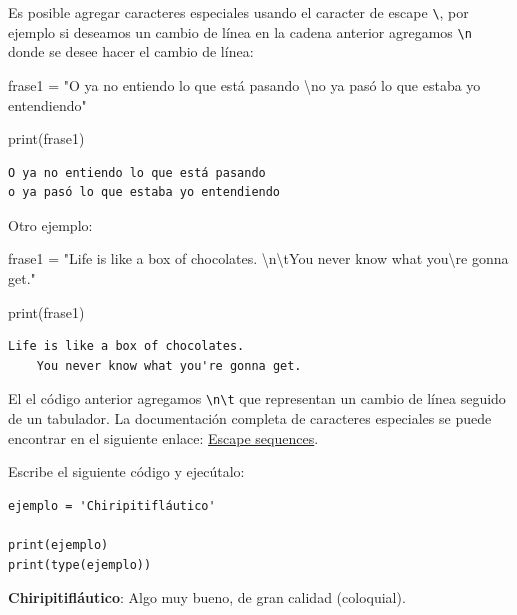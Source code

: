 \documentclass[
  spanish,
  letterpaper,
]{scrbook}
\newenvironment{Shaded}{\begin{snugshade}}{\end{snugshade}}
\newcommand{\BuiltInTok}[1]{\textcolor[rgb]{0.00,0.23,0.31}{#1}}
\newcommand{\CharTok}[1]{\textcolor[rgb]{0.13,0.47,0.30}{#1}}
\newcommand{\NormalTok}[1]{\textcolor[rgb]{0.00,0.23,0.31}{#1}}
\newcommand{\OperatorTok}[1]{\textcolor[rgb]{0.37,0.37,0.37}{#1}}
\newcommand{\StringTok}[1]{\textcolor[rgb]{0.13,0.47,0.30}{#1}}
\theoremstyle{definition}
\theoremstyle{remark}
\newcounter{quartocalloutexmno}
\newcommand{\quartocalloutexm}[1]{\refstepcounter{quartocalloutexmno}\label{#1}}
\begin{document}
Es posible agregar caracteres especiales usando el caracter de escape
\texttt{\textbackslash{}}, por ejemplo si deseamos un cambio de línea en
la cadena anterior agregamos \texttt{\textbackslash{}n} donde se desee
hacer el cambio de línea:

\begin{Shaded}
\begin{Highlighting}[]
\NormalTok{frase1 }\OperatorTok{=} \StringTok{"O ya no entiendo lo que está pasando }\CharTok{\textbackslash{}n}\StringTok{o ya pasó lo que estaba yo entendiendo"}

\BuiltInTok{print}\NormalTok{(frase1)}
\end{Highlighting}
\end{Shaded}

\begin{verbatim}
O ya no entiendo lo que está pasando 
o ya pasó lo que estaba yo entendiendo
\end{verbatim}

Otro ejemplo:

\begin{Shaded}
\begin{Highlighting}[]
\NormalTok{frase1 }\OperatorTok{=} \StringTok{"Life is like a box of chocolates. }\CharTok{\textbackslash{}n\textbackslash{}t}\StringTok{You never know what you}\CharTok{\textbackslash{}\textquotesingle{}}\StringTok{re gonna get."}

\BuiltInTok{print}\NormalTok{(frase1)}
\end{Highlighting}
\end{Shaded}

\begin{verbatim}
Life is like a box of chocolates. 
    You never know what you're gonna get.
\end{verbatim}

El el código anterior agregamos
\texttt{\textbackslash{}n\textbackslash{}t} que representan un cambio de
línea seguido de un tabulador. La documentación completa de caracteres
especiales se puede encontrar en el siguiente enlace:
\href{https://docs.python.org/es/3/reference/lexical_analysis.html\#escape-sequences}{Escape
sequences}.

\begin{tcolorbox}[enhanced jigsaw, colframe=quarto-callout-tip-color-frame, opacityback=0, toprule=.15mm, colback=white, coltitle=black, leftrule=.75mm, arc=.35mm, breakable, left=2mm, bottomtitle=1mm, rightrule=.15mm, bottomrule=.15mm, colbacktitle=quarto-callout-tip-color!10!white, toptitle=1mm, titlerule=0mm, opacitybacktitle=0.6, title={Tip \ref*{exm-l2-1}: Definición de una cadena.}]

\quartocalloutexm{exm-l2-1} 

Escribe el siguiente código y ejecútalo:

\begin{verbatim}
ejemplo = 'Chiripitifláutico'

print(ejemplo)
print(type(ejemplo))
\end{verbatim}

\textbf{Chiripitifláutico}: Algo muy bueno, de gran calidad (coloquial).

\end{tcolorbox}
\end{document}
